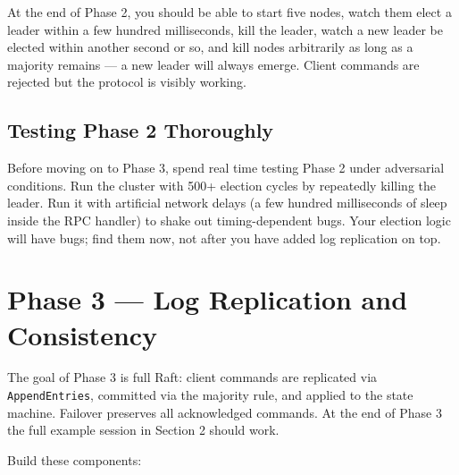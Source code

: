 \documentclass[11pt,a4paper]{article}
\begin{document}
At the end of Phase 2, you should be able to start five nodes, watch them elect a leader within a few hundred milliseconds, kill the leader, watch a new leader be elected within another second or so, and kill nodes arbitrarily as long as a majority remains --- a new leader will always emerge. Client commands are rejected but the protocol is visibly working.

\subsection{Testing Phase 2 Thoroughly}
Before moving on to Phase 3, spend real time testing Phase 2 under adversarial conditions. Run the cluster with 500+ election cycles by repeatedly killing the leader. Run it with artificial network delays (a few hundred milliseconds of sleep inside the RPC handler) to shake out timing-dependent bugs. Your election logic will have bugs; find them now, not after you have added log replication on top.

\section{Phase 3 --- Log Replication and Consistency}

The goal of Phase 3 is full Raft: client commands are replicated via \texttt{AppendEntries}, committed via the majority rule, and applied to the state machine. Failover preserves all acknowledged commands. At the end of Phase 3 the full example session in Section 2 should work.

Build these components:
\end{document}
